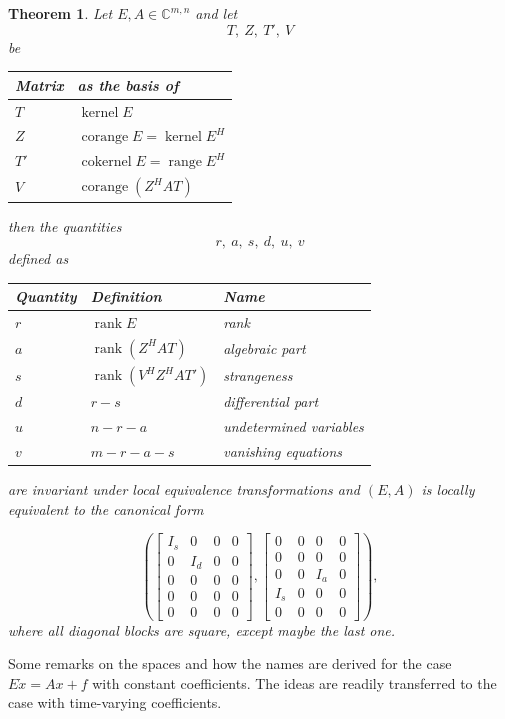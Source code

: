 \documentclass[]{book}
\newtheorem{theorem}{Theorem}[chapter]
\theoremstyle{definition}
\theoremstyle{definition}
\theoremstyle{definition}
\theoremstyle{remark}
\begin{document}
\begin{theorem}
\protect\hypertarget{thm:local-canonical-form}{}{\label{thm:local-canonical-form} }Let \(E, A \in \mathbb C^{m,n}\) and let
\begin{equation}
T,~Z,~T',~V \label{eq:lcf-subspaces}
\end{equation}
be

\begin{longtable}[]{@{}ll@{}}
\toprule
Matrix & as the basis of\tabularnewline
\midrule
\endhead
\(T\) & \(\operatorname{kernel}E\)\tabularnewline
\(Z\) & \(\operatorname{corange}E = \operatorname{kernel}E^H\)\tabularnewline
\(T'\) & \(\operatorname{cokernel}E = \operatorname{range}E^H\)\tabularnewline
\(V\) & \(\operatorname{corange}(Z^HAT)\)\tabularnewline
\bottomrule
\end{longtable}

then the quantities
\begin{equation}
r,~a,~s,~d,~u,~v \label{eq:lcf-quantities}
\end{equation}
defined as

\begin{longtable}[]{@{}lll@{}}
\toprule
Quantity & Definition & Name\tabularnewline
\midrule
\endhead
\(r\) & \(\operatorname{rank}E\) & \emph{rank}\tabularnewline
\(a\) & \(\operatorname{rank}(Z^HAT)\) & \emph{algebraic part}\tabularnewline
\(s\) & \(\operatorname{rank}(V^HZ^HAT')\) & \emph{strangeness}\tabularnewline
\(d\) & \(r-s\) & \emph{differential part}\tabularnewline
\(u\) & \(n-r-a\) & \emph{undetermined variables}\tabularnewline
\(v\) & \(m-r-a-s\) & \emph{vanishing equations}\tabularnewline
\bottomrule
\end{longtable}

are invariant under local equivalence transformations and \((E, A)\) is locally equivalent to the canonical form

\begin{equation}
\left(\begin{bmatrix}
I_s & 0 & 0 & 0 \\
0 & I_d & 0 & 0 \\
0 & 0 & 0 & 0 \\
0 & 0 & 0 & 0 \\
0 & 0 & 0 & 0
\end{bmatrix},
\begin{bmatrix}
0 & 0 & 0 & 0  \\
0 & 0 & 0 & 0  \\
0 & 0 & I_a & 0 \\
I_s & 0 & 0 & 0 \\
0 & 0 & 0 & 0
\end{bmatrix}\right),
\label{eq:local-canonical-form}
\end{equation}
where all diagonal blocks are square, except maybe the last one.
\end{theorem}
Some remarks on the spaces and how the names are derived for the case \(E\dot x = Ax +f\) with constant coefficients. The ideas are readily transferred to the case with time-varying coefficients.
\end{document}
